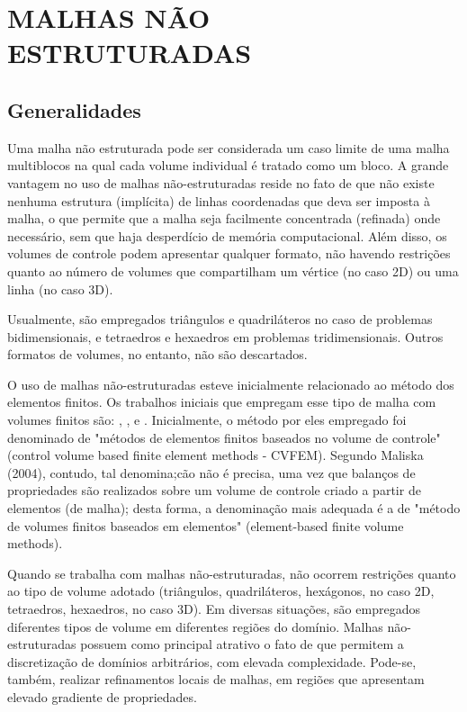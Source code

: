 \chapter[MALHAS NÃO ESTRUTURADAS]{MALHAS NÃO ESTRUTURADAS}
\label{MALHAS NAO ESTRUTURADAS}
\section{Generalidades}

Uma malha não estruturada pode ser considerada um caso limite de uma malha multiblocos na qual cada volume individual é tratado como um bloco. A grande vantagem no uso de malhas não-estruturadas reside no fato de que não existe nenhuma estrutura (implícita) de linhas coordenadas que deva ser imposta à malha, o que permite que a malha seja facilmente concentrada (refinada) onde necessário, sem que haja desperdício de memória computacional. Além disso, os volumes de controle podem apresentar qualquer formato, não havendo restrições quanto ao número de volumes que compartilham um vértice (no caso 2D) ou uma linha (no caso 3D).

Usualmente, são empregados triângulos e quadriláteros no caso de problemas bidimensionais, e tetraedros e hexaedros em problemas tridimensionais. Outros formatos de volumes, no entanto, não são descartados.

O uso de malhas não-estruturadas esteve inicialmente relacionado ao método dos elementos finitos. Os trabalhos iniciais que empregam esse tipo de malha com volumes finitos são: \cite{winslow1966numerical}, \cite{baliga1980new}, \cite{baliga1983solution} e \cite{eiser1985trying}. Inicialmente, o método por eles empregado foi denominado de "métodos de elementos finitos baseados no volume de controle"(control volume based finite element methods - CVFEM). Segundo Maliska (2004), contudo, tal denomina;cão não é precisa, uma vez que balanços de propriedades são realizados sobre um volume de controle criado a partir de elementos (de malha); desta forma, a denominação mais adequada é a de "método de volumes finitos baseados em elementos" (element-based finite volume methods).

Quando se trabalha com malhas não-estruturadas, não ocorrem restrições quanto ao tipo de volume adotado (triângulos, quadriláteros, hexágonos, no caso 2D, tetraedros, hexaedros, no caso 3D). Em diversas situações, são empregados diferentes tipos de volume em diferentes regiões do domínio. Malhas não-estruturadas possuem como principal atrativo o fato de que permitem a discretização de domínios arbitrários, com elevada complexidade. Pode-se, também, realizar refinamentos locais de malhas, em regiões que apresentam elevado gradiente de propriedades.

